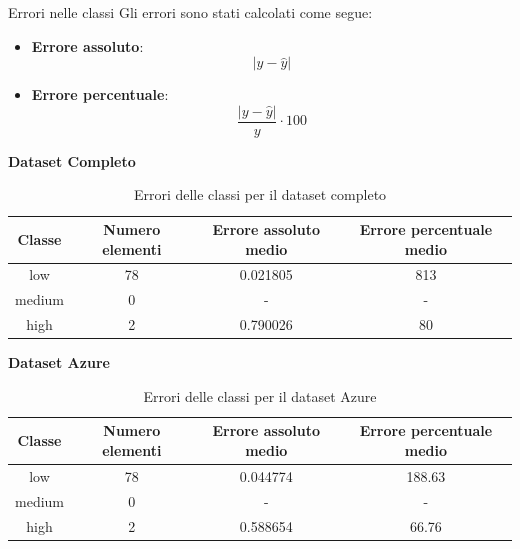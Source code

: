 \begin{frame}{Errori nelle classi}
    \tiny 
Gli errori sono stati calcolati come segue:
\begin{itemize}
    \item \textbf{Errore assoluto}:\begin{equation*}
        |y - \hat{y}|
         \end{equation*}
    \item \textbf{Errore percentuale}: \begin{equation*}
        \frac{|y - \hat{y}|}{y} \cdot 100
    \end{equation*}
\end{itemize}

\textbf{Dataset Completo}

\begin{table}[H]
    \centering
    \begin{tabular}{|c|c|c|c|}
        \hline
        \textbf{Classe} &  \textbf{Numero elementi} & \textbf{Errore assoluto medio} & \textbf{Errore percentuale medio} \\ \hline
        low             & 78                & 0.021805                   & 813            \\ \hline
        medium          & 0                & -                  & -            \\ \hline
        high            & 2                & 0.790026                   & 80            \\ \hline
    \end{tabular}
    \caption{Errori delle classi per il dataset completo}
\end{table}

\textbf{Dataset Azure}

\begin{table}[H]
    \centering
    \begin{tabular}{|c|c|c|c|}
        \hline
        \textbf{Classe} &  \textbf{Numero elementi} & \textbf{Errore assoluto medio} & \textbf{Errore percentuale medio} \\ \hline
        low             & 78                & 0.044774                   & 188.63            \\ \hline
        medium          & 0                & -                  & -            \\ \hline
        high            & 2                & 0.588654                   & 66.76            \\ \hline
    \end{tabular}
    \caption{Errori delle classi per il dataset Azure}
\end{table}

\end{frame}